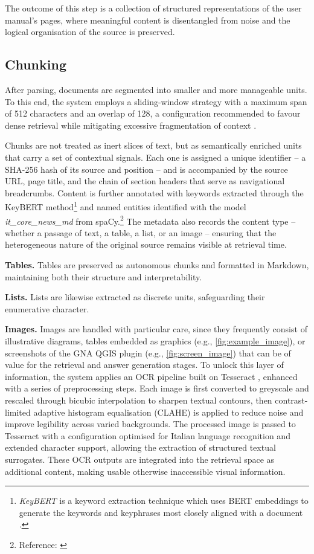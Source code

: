 \begin{spacing}{1.5}
The outcome of this step is a collection of structured representations of the user manual’s pages, where meaningful content is disentangled from noise and the logical organisation of the source is preserved.


\subsection{Chunking}
After parsing, documents are segmented into smaller and more manageable units. To this end, the system employs a sliding-window strategy with a maximum span of 512 characters and an overlap of 128, a configuration recommended to favour dense retrieval while mitigating excessive fragmentation of context \citep{wang_searching_2024}.

Chunks are not treated as inert slices of text, but as semantically enriched units that carry a set of contextual signals. Each one is assigned a unique identifier -- a SHA-256 hash of its source and position -- and is accompanied by the source URL, page title, and the chain of section headers that serve as navigational breadcrumbs. Content is further annotated with keywords extracted through the KeyBERT method\footnote{\textit{KeyBERT} is a keyword extraction technique which uses BERT embeddings to generate the keywords and keyphrases most closely aligned with a document \citep{grootendorst_maartengrkeybert_2025}.} and named entities identified with the model \textit{it\_core\_news\_md} from spaCy.\footnote{Reference: \textcite{noauthor_release_2024}} The metadata also records the content type -- whether a passage of text, a table, a list, or an image -- ensuring that the heterogeneous nature of the original source remains visible at retrieval time.

\textbf{Tables. }Tables are preserved as autonomous chunks and formatted in Markdown, maintaining both their structure and interpretability. 

\textbf{Lists. }Lists are likewise extracted as discrete units, safeguarding their enumerative character. 

\textbf{Images. }Images are handled with particular care, since they frequently consist of illustrative diagrams, tables embedded as graphics (e.g., \autoref{fig:example_image}), or screenshots of the GNA QGIS plugin (e.g., \autoref{fig:screen_image}) that can be of value for the retrieval and answer generation stages. To unlock this layer of information, the system applies an OCR pipeline built on Tesseract \citep{noauthor_tesseract_2025}, enhanced with a series of preprocessing steps. Each image is first converted to greyscale and rescaled through bicubic interpolation to sharpen textual contours, then contrast-limited adaptive histogram equalisation (CLAHE) is applied to reduce noise and improve legibility across varied backgrounds. The processed image is passed to Tesseract with a configuration optimised for Italian language recognition and extended character support, allowing the extraction of structured textual surrogates. These OCR outputs are integrated into the retrieval space as additional content, making usable otherwise inaccessible visual information.


\end{spacing}
